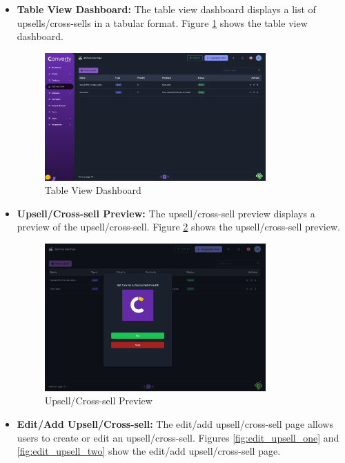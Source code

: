 \begin{itemize}
    \item \textbf{Table View Dashboard:} The table view dashboard displays a list of upsells/cross-sells in a tabular format. Figure \ref{fig:table_view_dashboard} shows the table view dashboard.
    \begin{figure}[H]
        \centering
        \includegraphics[width=0.8\textwidth]{images/tableViewDashboard.png}
        \caption{Table View Dashboard}
        \label{fig:table_view_dashboard}
    \end{figure}
    \item \textbf{Upsell/Cross-sell Preview:} The upsell/cross-sell preview displays a preview of the upsell/cross-sell. Figure \ref{fig:upsell_preview} shows the upsell/cross-sell preview.
    \begin{figure}[H]
        \centering
        \includegraphics[width=0.8\textwidth]{images/upsellPreview.png}
        \caption{Upsell/Cross-sell Preview}
        \label{fig:upsell_preview}
    \end{figure}
    \item \textbf{Edit/Add Upsell/Cross-sell:} The edit/add upsell/cross-sell page allows users to create or edit an upsell/cross-sell. Figures \ref{fig:edit_upsell_one} and \ref{fig:edit_upsell_two} show the edit/add upsell/cross-sell page.

\end{itemize}
